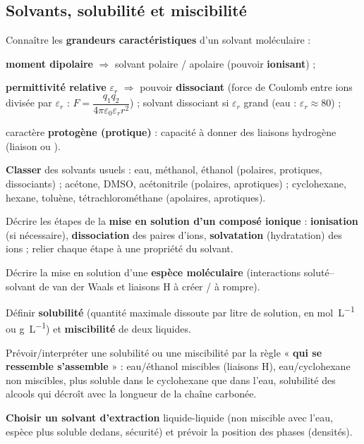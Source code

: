 \documentclass[11pt,a4paper]{article}
\begin{document}
\subsection{Solvants, solubilité et miscibilité}

\begin{savoir}
  \item Connaître les \textbf{grandeurs caractéristiques} d'un solvant moléculaire :
    \begin{savoir}
      \item \textbf{moment dipolaire} $\Rightarrow$ solvant polaire / apolaire (pouvoir \textbf{ionisant}) ;
      \item \textbf{permittivité relative} $\varepsilon_r$ $\Rightarrow$ pouvoir \textbf{dissociant}
            (force de Coulomb entre ions divisée par $\varepsilon_r$ :
            $F=\dfrac{q_1q_2}{4\pi\varepsilon_0\varepsilon_r r^2}$) ; solvant dissociant si
            $\varepsilon_r$ grand (eau : $\varepsilon_r\approx 80$) ;
      \item caractère \textbf{protogène (protique)} : capacité à donner des liaisons hydrogène
            (liaison  ou ).
    \end{savoir}
  \item \textbf{Classer} des solvants usuels : eau, méthanol, éthanol (polaires, protiques,
        dissociants) ; acétone, DMSO, acétonitrile (polaires, aprotiques) ;
        cyclohexane, hexane, toluène, tétrachlorométhane (apolaires, aprotiques).
  \item Décrire les étapes de la \textbf{mise en solution d'un composé ionique} :
        \textbf{ionisation} (si nécessaire), \textbf{dissociation} des paires d'ions,
        \textbf{solvatation} (hydratation) des ions ; relier chaque étape à une propriété du solvant.
  \item Décrire la mise en solution d'une \textbf{espèce moléculaire} (interactions soluté--solvant
        de van der Waals et liaisons H à créer / à rompre).
  \item Définir \textbf{solubilité} (quantité maximale dissoute par litre de solution, en
        \si{\mol\per\liter} ou \si{\gram\per\liter}) et \textbf{miscibilité} de deux liquides.
  \item Prévoir/interpréter une solubilité ou une miscibilité par la règle
        « \textbf{qui se ressemble s'assemble} » : eau/éthanol miscibles (liaisons H),
        eau/cyclohexane non miscibles,  plus soluble dans le cyclohexane que dans l'eau,
        solubilité des alcools qui décroît avec la longueur de la chaîne carbonée.
  \item \textbf{Choisir un solvant d'extraction} liquide-liquide (non miscible avec l'eau, espèce
        plus soluble dedans, sécurité) et prévoir la position des phases (densités).
\end{savoir}
\end{document}
